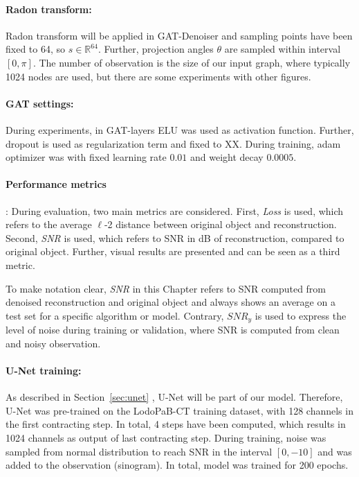 \paragraph{Radon transform:}
Radon transform will be applied in GAT-Denoiser and sampling points have been fixed to 64, so $s \in \mathbb{R}^64$.
Further, projection angles $\theta$ are sampled within interval $[0, \pi]$.
The number of observation is the size of our input graph, where typically 1024 nodes are used, but 
there are some experiments with other figures.


\paragraph{GAT settings:}
During experiments, in GAT-layers ELU was used as activation function.
Further, dropout is used as regularization term and fixed to XX.
During training, adam optimizer was with fixed learning rate $0.01$ and weight decay $0.0005$.


\paragraph{Performance metrics}:
During evaluation, two main metrics are considered.
First, \textit{Loss} is used, which refers to the average $\ell$-2 distance between original object and reconstruction.
Second, \textit{SNR} is used, which refers to SNR in dB of reconstruction, compared to original object.
Further, visual results are presented and can be seen as a third metric.

To make notation clear, \textit{SNR} in this Chapter refers to SNR computed from denoised reconstruction and original object 
and always shows an average on a test set for a specific algorithm or model.
Contrary, $\textit{SNR}_y$ is used to express the level of noise during training or validation, 
where SNR is computed from clean and noisy observation.

\paragraph{U-Net training:}
As described in Section~\ref{sec:unet} \textit{}, U-Net will be part of our model.
Therefore, U-Net was pre-trained on the LodoPaB-CT training dataset, with 128 channels in the first contracting step. 
In total, 4 steps have been computed, which results in 1024 channels as output of last contracting step.
During training, noise was sampled from normal distribution to reach SNR in the interval $[0, -10]$ and was added to the observation (sinogram). 
In total, model was trained for 200 epochs.


